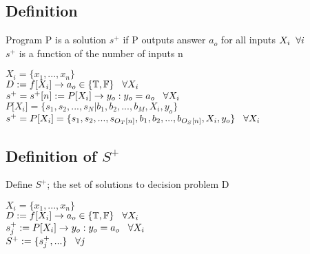 \documentclass[11pt]{article}
\begin{document}
\subsection{Definition}
Program P is a solution $s^{+}$ if P outputs answer $a_o$ for all inputs $X_i \hspace{2mm} \forall i$\\
$s^+$ is a function of the number of inputs n
\begin{center}
\vspace{1mm}
$
X_i = \{x_1,...,x_n\}
$
\\ \vspace{2mm}
$
D := f \lbrack X_i \rbrack \rightarrow a_{o} \in \{\mathbb{T}, \mathbb{F}\} \hspace{3mm} \forall X_i
$
\\ \vspace{2mm}
$
s^+ = s^+\lbrack n \rbrack := P \lbrack X_i \rbrack \rightarrow y_{o} : y_o = a_{o} \hspace{3mm} \forall X_i
$
\\ \vspace{2mm}
$
P \lbrack X_i \rbrack = \{ s_1,s_2,...,s_N| b_1, b_2,...,b_M,X_i,y_o\}
$
\\ \vspace{3mm}
$
s^+ = P \lbrack X_i \rbrack = \{ s_1,s_2,...,s_{O_T \lbrack n \rbrack }, b_1, b_2,...,b_{O_S \lbrack n \rbrack},X_i,y_o \} \hspace{3mm} \forall X_i
$
\end{center}

\subsection{Definition of $S^+$}
Define $S^+$; the set of solutions to decision problem D
\begin{center}
$
X_i = \{x_1,...,x_n\}
$
\\ \vspace{2mm}
$
D := f \lbrack X_i \rbrack \rightarrow a_{o} \in \{\mathbb{T}, \mathbb{F}\} \hspace{3mm} \forall X_i
$
\\ \vspace{2mm}
$
s_j^+ := P \lbrack X_i \rbrack \rightarrow y_{o} : y_o = a_{o} \hspace{3mm} \forall X_i
$
\\ \vspace{2mm}
$
S^+ := \{s^+_j,...\} \hspace{3mm} \forall j
$
\end{center}
\end{document}
